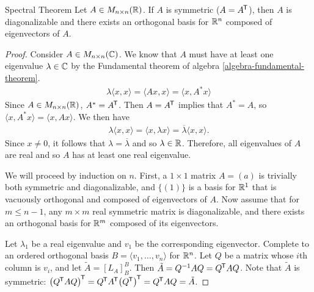 \begin{thm}Spectral Theorem\label{spectral-theorem}\proofbreak
    Let $A \in M_{n \times n}(\mathbb{R})$. If $A$ is symmetric ($A = {A}^{\mkern-1.5mu\mathsf{T}}$), then $A$ is diagonalizable and there exists an orthogonal basis for $\mathbb{R}^n$ composed of eigenvectors of $A$.
\end{thm}

\begin{proof}
    Consider $A \in M_{n \times n}(\mathbb{C})$. We know that $A$ must have at least one eigenvalue $\lambda \in \mathbb{C}$ by the Fundamental theorem of algebra \ref{algebra-fundamental-theorem}.
    \begin{align*}
        \lambda\langle x, x\rangle = \langle Ax, x \rangle = \langle x, A^*x\rangle
    \end{align*}
    Since $A \in M_{n \times n}(\mathbb{R})$, $A^* = {A}^{\mkern-1.5mu\mathsf{T}}$. Then $A = {A}^{\mkern-1.5mu\mathsf{T}}$ implies that $A^* = A$, so $\langle x, A^*x \rangle = \langle x, Ax \rangle$. We then have
    \begin{align*}
        \lambda\langle x, x\rangle = \langle x, \lambda x\rangle = \overline{\lambda}\langle x, x \rangle.
    \end{align*}
    Since $x \neq 0$, it follows that $\lambda = \overline{\lambda}$ and so $\lambda \in \mathbb{R}$. Therefore, all eigenvalues of $A$ are real and so $A$ has at least one real eigenvalue.

    We will proceed by induction on $n$. First, a $1 \times 1$ matrix $A = (a)$ is trivially both symmetric and diagonalizable, and $\{(1)\}$ is a basis for $\mathbb{R}^1$ that is vacuously orthogonal and composed of eigenvectors of $A$. Now assume that for $m \leq n-1$, any $m \times m$ real symmetric matrix is diagonalizable, and there exists an orthogonal basis for $\mathbb{R}^m$ composed of its eigenvectors.
    
    Let $\lambda_1$ be a real eigenvalue and $v_1$ be the corresponding eigenvector. Complete to an ordered orthogonal basis $B = \langle v_1, \ldots, v_n \rangle$ for $\mathbb{R}^n$. Let $Q$ be a matrix whose $i$th column is $v_i$, and let
    $\tilde{A} = [L_A]_{B}^{B}$. Then $\tilde{A} = Q^{-1}AQ = {Q}^{\mkern-1.5mu\mathsf{T}}AQ$. Note that $\tilde{A}$ is symmetric: ${\left({Q}^{\mkern-1.5mu\mathsf{T}}AQ\right)}^{\mkern-1.5mu\mathsf{T}} = {Q}^{\mkern-1.5mu\mathsf{T}}{A}^{\mkern-1.5mu\mathsf{T}}{\left({Q}^{\mkern-1.5mu\mathsf{T}}\right)}^{\mkern-1.5mu\mathsf{T}} = {Q}^{\mkern-1.5mu\mathsf{T}}AQ = \tilde{A}$.


\end{proof}
